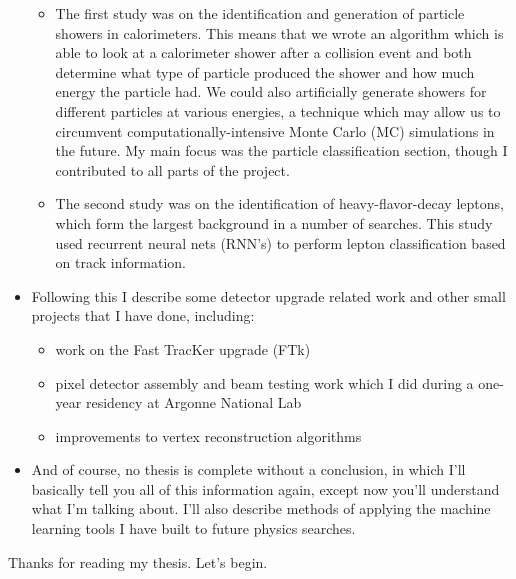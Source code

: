 \begin{itemize}
\begin{itemize}
        \item The first study was on the identification and generation of particle showers in calorimeters. This means that we wrote an algorithm which is able to look at a calorimeter shower after a collision event and both determine what type of particle produced the shower and how much energy the particle had. We could also artificially generate showers for different particles at various energies, a technique which may allow us to circumvent computationally-intensive Monte Carlo (MC) simulations in the future. My main focus was the particle classification section, though I contributed to all parts of the project.

        \item The second study was on the identification of heavy-flavor-decay leptons, which form the largest background in a number of searches. This study used recurrent neural nets (RNN's) to perform lepton classification based on track information.

    \end{itemize}

    \item Following this I describe some detector upgrade related work and other small projects that I have done, including:
    
    \begin{itemize}
        \item work on the Fast TracKer upgrade (FTk)
        \item pixel detector assembly and beam testing work which I did during a one-year residency at Argonne National Lab
        \item improvements to vertex reconstruction algorithms
    \end{itemize}

    \item And of course, no thesis is complete without a conclusion, in which I'll basically tell you all of this information again, except now you'll understand what I'm talking about. I'll also describe methods of applying the machine learning tools I have built to future physics searches.

\end{itemize}

Thanks for reading my thesis. Let's begin.